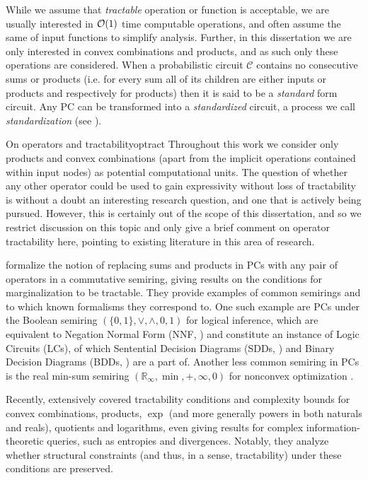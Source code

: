 While we assume that \emph{tractable} operation or function is acceptable, we are usually
interested in $\mathcal{O}(1)$ time computable operations, and often assume the same of input functions
to simplify analysis. Further, in this dissertation we are only interested in convex combinations
and products, and as such only these operations are considered. When a probabilistic circuit
$\mathcal{C}$ contains no consecutive sums or products (i.e. for every sum all of its children are
either inputs or products and respectively for products) then it is said to be a \emph{standard}
form circuit. Any PC can be transformed into a \emph{standardized} circuit, a process we call
\emph{standardization} (see ).

\begin{remark}[breakable]{On operators and tractability}{optract}
  Throughout this work we consider only products and convex combinations (apart from the implicit
  operations contained within input nodes) as potential computational units. The question of whether
  any other operator could be used to gain expressivity without loss of tractability is without a
  doubt an interesting research question, and one that is actively being pursued. However, this is
  certainly out of the scope of this dissertation, and so we restrict discussion on this topic and
  only give a brief comment on operator tractability here, pointing to existing literature in this
  area of research.

  \citet{friesen16} formalize the notion of replacing sums and products in PCs with any pair of
  operators in a commutative semiring, giving results on the conditions for marginalization to be
  tractable. They provide examples of common semirings and to which known formalisms they
  correspond to. One such example are PCs under the Boolean semiring $(\{0,1\},\vee,\wedge,0,1)$
  for logical inference, which are equivalent to Negation Normal Form (NNF, \cite{barwise82}) and
  constitute an instance of Logic Circuits (LCs), of which Sentential Decision Diagrams (SDDs,
  \cite{darwiche11}) and Binary Decision Diagrams (BDDs, \cite{akers78}) are a part of. Another
  less common semiring in PCs is the real min-sum semiring $(\mathbb{R}_{\infty}, \min,+,\infty,0)$
  for nonconvex optimization \citep{friesen15}.

  Recently, \citet{vergari21} extensively covered tractability conditions and complexity bounds for
  convex combinations, products, $\exp$ (and more generally powers in both naturals and reals),
  quotients and logarithms, even giving results for complex information-theoretic queries, such as
  entropies and divergences. Notably, they analyze whether structural constraints (and thus, in a
  sense, tractability) under these conditions are preserved.


\end{remark}
